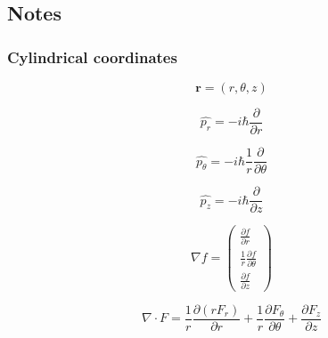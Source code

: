 \documentclass[12pt, a4paper]{article}
\begin{document}
\subsection{Notes}
\subsubsection{Cylindrical coordinates}
$$\bm{r} = (r, \theta, z)$$


$$\hat {p_r} = - i \hbar \frac{\partial}{\partial r}$$

$$\hat{p_\theta} = - i \hbar \frac{1}{r} \frac{\partial}{\partial \theta}$$

$$\hat{p_z} = - i \hbar \frac{\partial}{\partial z}$$

$$\renewcommand\arraystretch{1.5}
\nabla f = 
\begin{pmatrix}
\frac{\partial f}{\partial r} \\
\frac{1}{r} \frac{\partial f}{\partial \theta}  \\
\frac{\partial f}{\partial z} 
\end{pmatrix}
$$


$$
\nabla \cdot F =
\frac{1}{r} \frac{\partial (r F_r)}{\partial r}
+ \frac{1}{r} \frac{\partial F_\theta}{\partial \theta}
+ \frac{\partial F_z}{\partial z}
$$
\end{document}
